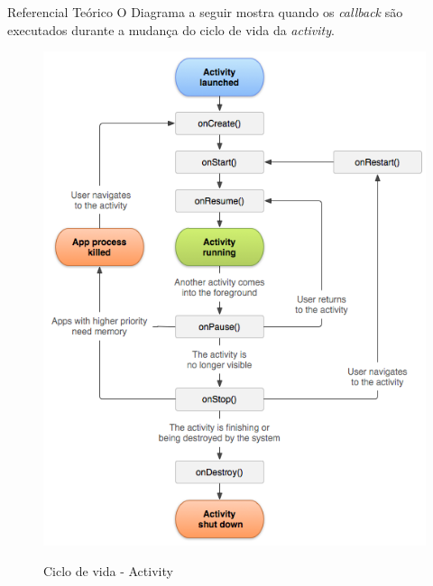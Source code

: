 \documentclass[
	12pt,				%
	openright,			%
	twoside,			%
	a4paper,			%
	english,			%
	french,				%
	spanish,			%
	brazil				%
	]{abntex2}
\begin{document}
\begin{chapter}{Referencial Teórico}
O Diagrama a seguir mostra quando os \textit{callback} são executados durante a mudança do ciclo de vida da \textit{activity}.
\begin{figure}[h]
\centering
   \caption{Ciclo de vida - Activity}
   \includegraphics[scale=0.70]{media/activity_lifecycle.png}
     \label{fig:lifecycle}
\end{figure}


\end{chapter}
\end{document}
